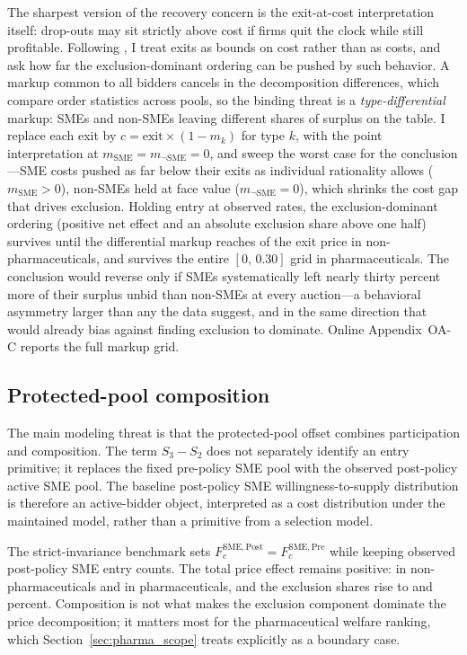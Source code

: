 The sharpest version of the recovery concern is the exit-at-cost
interpretation itself: drop-outs may sit strictly above cost if firms quit
the clock while still profitable. Following \citet{haile2003}, I treat exits
as bounds on cost rather than as costs, and ask how far the
exclusion-dominant ordering can be pushed by such behavior. A markup common
to all bidders cancels in the decomposition differences, which compare
order statistics across pools, so the binding threat is a
\emph{type-differential} markup: SMEs and non-SMEs leaving different shares
of surplus on the table. I replace each exit by $c=\text{exit}\times(1-m_k)$
for type $k$, with the point interpretation at
$m_{\mathrm{SME}}=m_{\neg\mathrm{SME}}=0$, and sweep the worst case for the
conclusion---SME costs pushed as far below their exits as individual
rationality allows ($m_{\mathrm{SME}}>0$), non-SMEs held at face value
($m_{\neg\mathrm{SME}}=0$), which shrinks the cost gap that drives
exclusion. Holding entry at observed rates, the exclusion-dominant ordering
(positive net effect and an absolute exclusion share above one half)
survives until the differential markup reaches \ipvSlackBreakNp{} of the
exit price in non-pharmaceuticals, and survives the entire $[0,\,0.30]$ grid
in pharmaceuticals. The conclusion would reverse only if SMEs systematically
left nearly thirty percent more of their surplus unbid than non-SMEs at
every auction---a behavioral asymmetry larger than any the data suggest, and
in the same direction that would already bias against finding exclusion to
dominate. Online Appendix~OA-C reports the full markup grid.

\subsection{Protected-pool composition}

The main modeling threat is that the protected-pool offset combines
participation and composition. The term $S_3-S_2$ does not separately
identify an entry primitive; it replaces the fixed pre-policy SME pool with
the observed post-policy active SME pool. The baseline post-policy SME
willingness-to-supply distribution is therefore an active-bidder object,
interpreted as a cost distribution under the maintained model, rather than
a primitive from a selection model.

The strict-invariance benchmark sets
$F_c^{\mathrm{SME,Post}}=F_c^{\mathrm{SME,Pre}}$ while keeping observed
post-policy SME entry counts. The total price effect remains positive:
\siDeltaTotalNp{} in non-pharmaceuticals and \siDeltaTotalPh{} in
pharmaceuticals, and the exclusion shares rise to \strictShareNp{} and
\strictSharePh{} percent. Composition is not what makes the exclusion
component dominate the price decomposition; it matters most for the
pharmaceutical welfare ranking, which Section~\ref{sec:pharma_scope} treats
explicitly as a boundary case.

